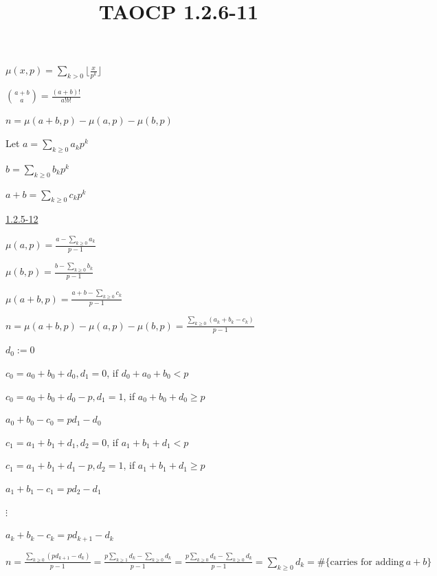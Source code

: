 \documentclass{article}
\title{TAOCP 1.2.6\mbox{-}11}
\begin{document}
\maketitle

\( \mu(x,p) = \sum_{k > 0}{\lfloor{\frac{x}{p^{k}}}\rfloor} \)

\( \binom{a+b}{a} = \frac{(a+b)!}{a!b!} \)

\( n = \mu(a+b,p) - \mu(a,p) - \mu(b, p) \)

Let \( a = \sum_{k \geq 0} a_{k} p^{k} \)

\( b = \sum_{k \geq 0} b_{k} p^{k} \)

\( a + b = \sum_{k \geq 0} c_{k} p^{k} \)

\href{../1.2.5. Permutations and Factorials/1.2.5-12.pdf}{1.2.5\mbox{-}12}

\( \mu(a, p) = \frac{a - \sum_{k \geq 0} a_{k}}{p-1} \)

\( \mu(b, p) = \frac{b - \sum_{k \geq 0} b_{k}}{p-1} \)

\( \mu(a+b, p) = \frac{a+b - \sum_{k \geq 0} c_{k}}{p-1} \)

\( n = \mu(a+b,p) - \mu(a,p) - \mu(b, p) = \frac{\sum_{k \geq 0}(a_{k} + b_{k} - c_{k})}{p-1} \)

\( d_{0} := 0 \)

\( c_{0} = a_{0} + b_{0} + d_{0}, d_{1} = 0 \), if \( d_{0} + a_{0} + b_{0} < p \)

\( c_{0} = a_{0} + b_{0} + d_{0} - p, d_{1} = 1 \), if \( a_{0} + b_{0} + d_{0} \geq p \)

\( a_{0} + b_{0} - c_{0} = pd_{1} - d_{0} \)

\( c_{1} = a_{1} + b_{1} + d_{1}, d_{2} = 0 \), if \( a_{1} + b_{1} + d_{1} < p \)

\( c_{1} = a_{1} + b_{1} + d_{1} - p, d_{2} = 1 \), if \( a_{1} + b_{1} + d_{1} \geq p \)

\( a_{1} + b_{1} - c_{1} = pd_{2} - d_{1} \)

\( \vdots \)

\( a_{k} + b_{k} - c_{k} = pd_{k+1} - d_{k} \)

\( n = \frac{\sum_{k \geq 0}(pd_{k+1} - d_{k})}{p-1} = \frac{p \sum_{k \geq 1}d_{k} - \sum_{k \geq 0}d_{k}}{p - 1} = \frac{p \sum_{k \geq 0}d_{k} - \sum_{k \geq 0}d_{k}}{p - 1} = \sum_{k \geq 0}d_{k} = \# \{ \textrm{carries for adding}\ a+b \} \)
\end{document}
